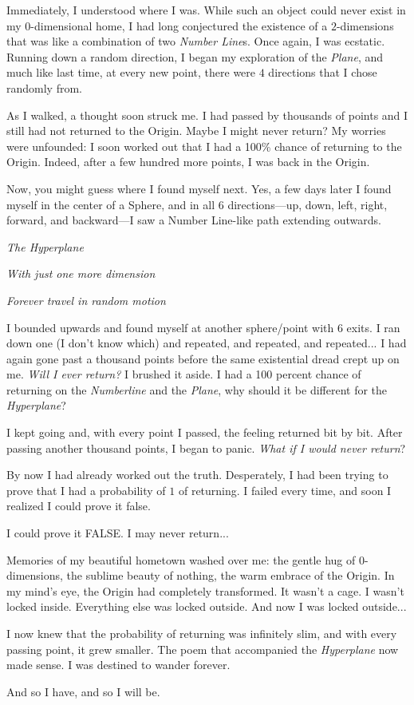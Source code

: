 \documentclass{article}
\begin{document}
Immediately, I understood where I was. While such an object could never exist in my $0$-dimensional home, I had long conjectured the existence of a $2$-dimensions that was like a combination of two \emph{Number Line}s. Once again, I was ecstatic. Running down a random direction, I began my exploration of the \emph{Plane}, and much like last time, at every new point, there were $4$ directions that I chose randomly from.

As I walked, a thought soon struck me. I had passed by thousands of points and I still had not returned to the Origin. Maybe I might never return? My worries were unfounded: I soon worked out that I had a 100\% chance of returning to the Origin. Indeed, after a few hundred more points, I was back in the Origin. 

Now, you might guess where I found myself next. Yes, a few days later I found myself in the center of a Sphere, and in all $6$ directions---up, down, left, right, forward, and backward---I saw a Number Line-like path extending outwards.

\emph{The Hyperplane}

\emph{
With just one more dimension}

\emph{
Forever travel in random motion
}

I bounded upwards and found myself at another sphere/point with 6 exits. I ran down one (I don't know which) and repeated, and repeated, and repeated... I had again gone past a thousand points before the same existential dread crept up on me. \emph{Will I ever return?} I brushed it aside. I had a 100 percent chance of returning on the \emph{Numberline} and the \emph{Plane}, why should it be different for the \emph{Hyperplane}? 

I kept going and, with every point I passed, the feeling returned bit by bit. After passing another thousand points, I began to panic. \emph{What if I would never return}?

By now I had already worked out the truth. Desperately, I had been trying to prove that I had a probability of $1$ of returning. I failed every time, and soon I realized I could prove it false. 

I could prove it FALSE. I may never return... 

Memories of my beautiful hometown washed over me: the gentle hug of $0$-dimensions, the sublime beauty of nothing, the warm embrace of the Origin. In my mind's eye, the Origin had completely transformed. It wasn't a cage. I wasn't locked inside. Everything else was locked outside. And now I was locked outside...

I now knew that the probability of returning was infinitely slim, and with every passing point, it grew smaller. The poem that accompanied the \emph{Hyperplane} now made sense. I was destined to wander forever.

And so I have, and so I will be. 
\end{document}
